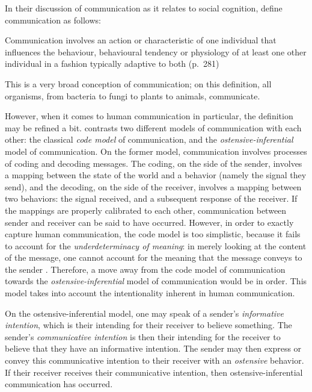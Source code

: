 In their discussion of communication as it relates to social cognition, \citet{Freeberg19} define communication as follows:
\begin{quoting}
    Communication involves an action or characteristic of one individual that influences the behaviour, behavioural tendency or physiology of at least one other individual in a fashion typically adaptive to both
    \hfill (p.~281)
\end{quoting}
This is a very broad conception of communication; on this definition, all organisms, from bacteria to fungi to plants to animals, communicate.

However, when it comes to human communication in particular, the definition may be refined a bit. \citet{Scott-Phillips18-communication, Scott-Phillips15-primate} contrasts two different models of communication with each other: the classical \emph{code model} of communication, and the \emph{ostensive-inferential} model of communication.
On the former model, communication involves processes of coding and decoding messages. The coding, on the side of the sender, involves a mapping between the state of the world and a behavior (namely the signal they send), and the decoding, on the side of the receiver, involves a mapping between two behaviors: the signal received, and a subsequent response of the receiver. If the mappings are properly calibrated to each other, communication between sender and receiver can be said to have occurred.
However, in order to exactly capture human communication, the code model is too simplistic, because it fails to account for the \emph{underdeterminacy of meaning}: in merely looking at the content of the message, one cannot account for the meaning that the message conveys to the sender \citep{Scott-Phillips18-communication}. 
Therefore, a move away from the code model of communication towards the \emph{ostensive-inferential} model of communication would be in order. This model takes into account the intentionality inherent in human communication.

On the ostensive-inferential model, one may speak of a sender's \emph{informative intention}, which is their intending for their receiver to believe something. The sender's \emph{communicative intention} is then their intending for the receiver to believe that they have an informative intention. The sender may then express or convey this communicative intention to their receiver with an \emph{ostensive} behavior. If their receiver receives their communicative intention, then ostensive-inferential communication has occurred.

